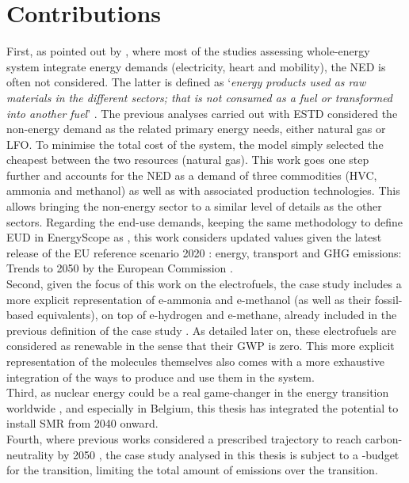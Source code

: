 \section*{Contributions}
\label{sec:cs:contributions}
First, as pointed out by \citet{rixhon2022integration}, where most of the studies assessing whole-energy system integrate energy demands (\ie electricity, heart and mobility), the \gls{NED} is often not considered. The latter is defined as ‘\textit{energy products used as raw materials in the different sectors; that is not consumed as a fuel or transformed into another fuel}’ \cite{Eurostat2019}. The previous analyses carried out with \gls{ESTD} considered the non-energy demand as the related primary energy needs, \ie either natural gas or \gls{LFO}. To minimise the total cost of the system, the model simply selected the cheapest between the two resources (\ie natural gas). This work goes one step further and accounts for the \gls{NED} as a demand of three commodities (\ie \gls{HVC}, ammonia and methanol) as well as with associated production technologies. This allows bringing the non-energy sector to a similar level of details as the other sectors.  Regarding the end-use demands,  keeping the same methodology to define \gls{EUD} in EnergyScope as \citet{Limpens2020}, this work considers updated values given the latest release of the \og EU reference scenario 2020 : energy, transport and GHG emissions: Trends to 2050 \fg by the European Commission \cite{EuropeanCommission2021}.\\

Second, given the focus of this work on the electrofuels, the case study includes a more explicit representation of e-ammonia and e-methanol (as well as their fossil-based equivalents), on top of e-hydrogen and e-methane, already included in the previous definition of the case study \cite{limpens2021generating}. As detailed later on, these electrofuels are considered as renewable in the sense that their \gls{GWP} is zero. This more explicit representation of the molecules themselves also comes with a more exhaustive integration of the ways to produce and use them in the system.\\

Third, as nuclear energy could be a real game-changer in the energy transition worldwide \cite{IEA2022nuclear}, and especially in Belgium, this thesis has integrated the potential to install \gls{SMR} from 2040 onward.\\

Fourth, where previous works considered a prescribed  trajectory to reach carbon-neutrality by 2050 \cite{limpens2021generating, limpens2024pathway}, the case study analysed in this thesis is subject to a -budget for the transition, \ie limiting the total amount of emissions over the transition.\\

